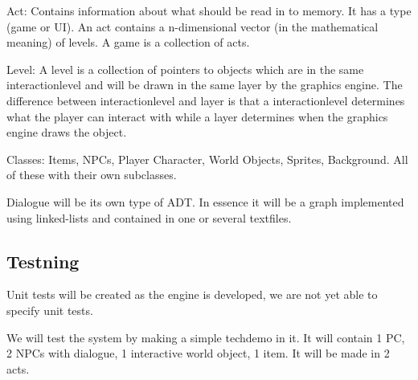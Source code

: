 \documentclass[12pt,a4paper]{article}
\begin{document}
Act: Contains information about what should be read in to memory. It has a type (game or UI). An act contains a n-dimensional vector (in the mathematical meaning) of levels. A game is a collection of acts.


Level: A level is a collection of pointers to objects which are in the same interactionlevel and will be drawn in the same layer by the graphics engine. The difference between interactionlevel and layer is that a interactionlevel determines what the player can interact with while a layer determines when the graphics engine draws the object.


Classes: Items, NPCs, Player Character, World Objects, Sprites, Background. All of these with their own subclasses.

Dialogue will be its own type of ADT. In essence it will be a graph implemented using linked-lists and contained in one or several textfiles. 


\subsection{Testning}

Unit tests will be created as the engine is developed, we are not yet able to specify unit tests.

We will test the system by making a simple techdemo in it. It will contain 1 PC, 2 NPCs with dialogue, 1 interactive world object, 1 item. It will be made in 2 acts.

\end{document}
